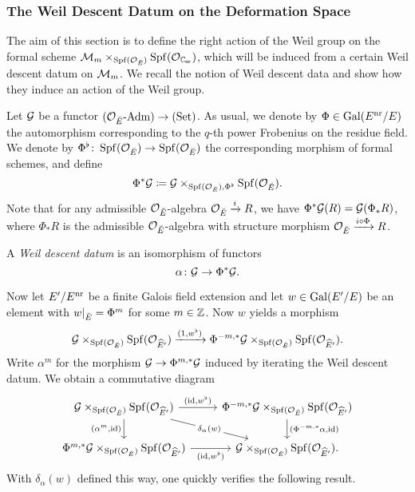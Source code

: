 \documentclass[../main.tex]{subfiles}
\begin{document}

\subsubsection{The Weil Descent Datum on the Deformation Space} %
\label{ssub:The Weil Descent Datum}
The aim of this section is to define the right action of the Weil 
group on the formal scheme 
$\cM_m \times_{\spf(\cO_\br E)} \spf(\cO_\Cp)$, which will be induced
from a certain Weil descent datum on $\mathcal{M}_m$. 
We recall the notion of Weil descent data and show how they induce
an action of the Weil group.

Let $\mathcal{G}$ be a functor ${({\mathcal{O}_{\breve {E}}}\textnormal-\allowbreak\mathrm{Adm})} \to {(\mathrm{Set})}$. As usual, we denote
by $\Phi \in \operatorname{Gal}(E^{\mathrm{nr}}/E)$ the automorphism corresponding to the
$q$-th power Frobenius on the residue field. We denote
by $\Phi^\flat\colon \operatorname{Spf}(\mathcal{O}_{\breve {E}}) \to \operatorname{Spf}(\mathcal{O}_{\breve {E}})$ the 
corresponding morphism of formal schemes, and define
\begin{equation*}
  \Phi^* \mathcal{G} \coloneqq \mathcal{G} \times_{\operatorname{Spf}(\mathcal{O}_{\breve {E}}), \Phi^\flat}
  \operatorname{Spf}(\mathcal{O}_{\breve {E}}).
\end{equation*}
Note that for any admissible $\mathcal{O}_{\breve {E}}$-algebra $\mathcal{O}_{\breve {E}} \xrightarrow{i} R$, we have
$\Phi^* \mathcal{G}(R) = \mathcal{G}(\Phi_* R)$, where $\Phi_* R$ is the admissible
$\mathcal{O}_{\breve {E}}$-algebra with structure morphism $\mathcal{O}_{\breve {E}} \xrightarrow{i \circ \Phi}
R$. 

\begin{defi}\label{def:WeilDD}
  A \emph{Weil descent datum} is an isomorphism of functors
  \begin{equation*}
    \alpha\colon \mathcal{G} \to \Phi^* \mathcal{G}.
  \end{equation*}
\end{defi}

Now let $E'/E^{\mathrm{nr}}$ be a finite Galois field extension and let 
$w \in \operatorname{Gal}(E'/E)$ be an element with $w|_{\breve {E}} = \Phi^m$ for some
$m \in \mathbb{Z}$. Now $w$ yields a morphism
\begin{equation*}
  \mathcal{G} \times_{\operatorname{Spf}(\mathcal{O}_{\breve {E}})} \operatorname{Spf}(\mathcal{O}_{\widehat E'}) \xrightarrow{(1, w^\flat)}
  \Phi^{-m, *} \mathcal{G} \times_{\operatorname{Spf}(\mathcal{O}_{\breve {E}})} \operatorname{Spf}(\mathcal{O}_{\widehat E'}).
\end{equation*}
Write $\alpha^m$ for the morphism $\mathcal{G} \to \Phi^{m,*} \mathcal{G}$ 
induced by iterating the Weil descent datum. We obtain a commutative diagram
\begin{equation*}
\begin{tikzcd}[ampersand replacement=\&]
	{\cG \times_{\spf(\cO_\br E)}\spf(\cO_{\hat E'})} \& {\Phi^{-m,*}\cG \times_{\spf(\cO_\br E)}\spf(\cO_{\hat E'})} \\
	{\Phi^{m,*}\cG \times_{\spf(\cO_\br E)}\spf(\cO_{\hat E'})} \& {\cG \times_{\spf(\cO_\br E)}\spf(\cO_{\hat E'}).}
	\arrow["{(\id, w^\flat)}", from=1-1, to=1-2]
	\arrow["{(\alpha^m, \id)}"', from=1-1, to=2-1]
	\arrow["{\delta_\alpha(w)}"{description}, from=1-1, to=2-2]
	\arrow["{(\Phi^{-m,*}\alpha, \id)}", from=1-2, to=2-2]
	\arrow["{(\id, w^\flat)}"', from=2-1, to=2-2]
\end{tikzcd}
\end{equation*}
With $\delta_\alpha(w)$ defined this way, one quickly verifies the following
result.
\end{document}
